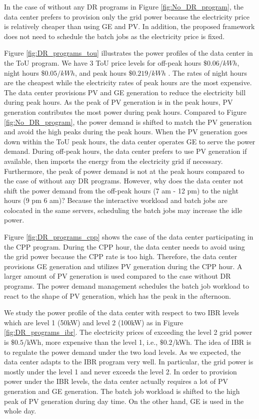 In the case of without any DR programs in Figure \ref{fig:No_DR_program}, the data center prefers to provision only the grid power because the electricity price is relatively cheaper than using GE and PV. In addition, the proposed framework does not need to schedule the batch jobs as the electricity price is fixed.

Figure \ref{fig:DR_programs_tou} illustrates the power profiles of the data center in the ToU program. We have 3 ToU price levels for off-peak hours $\$0.06/kWh$, night hours $\$0.05/kWh$, and peak hours $\$0.219/kWh$ \cite{Shahan2011ToUTexas}. The rates of night hours are the cheapest while the electricity rates of peak hours are the most expensive. The data center provisions PV and GE generation to reduce the electricity bill during peak hours. As the peak of PV generation is in the peak hours, PV generation contributes the most power during peak hours. Compared to Figure \ref{fig:No_DR_program}, the power demand is shifted to match the PV generation and avoid the high peaks during the peak hours. When the PV generation goes down within the ToU peak hours, the data center operates GE to serve the power demand. During off-peak hours, the data center prefers to use PV generation if available, then imports the energy from the electricity grid if necessary. Furthermore, the peak of power demand is not at the peak hours compared to the case of without any DR programs. However, why does the data center not shift the power demand from the off-peak hours (7 am - 12 pm) to the night hours (9 pm 6 am)? Because the interactive workload and batch jobs are colocated in the same servers, scheduling the batch jobs may increase the idle power.

Figure \ref{fig:DR_programs_cpp} shows the case of the data center participating in the CPP program. During the CPP hour, the data center needs to avoid using the grid power because the CPP rate is too high. Therefore, the data center provisions GE generation and utilizes PV generation during the CPP hour. A larger amount of PV generation is used compared to the case without DR programs. The power demand management schedules the batch job workload to react to the shape of PV generation, which has the peak in the afternoon.

We study the power profile of the data center with respect to two IBR levels which are level 1 (50kW) and level 2 (100kW) as in Figure \ref{fig:DR_programs_ibr}. The electricity prices of exceeding the level 2 grid power is $\$0.5$/kWh, more expensive than the level 1, i.e., $\$0.2$/kWh.  The idea of IBR is to regulate the power demand under the two load levels. As we expected, the data center adapts to the IBR program very well. In particular, the grid power is mostly under the level 1 and never exceeds the level 2. In order to provision power under the IBR levels, the data center actually requires a lot of PV generation and GE generation. The batch job workload is shifted to the high peak of PV generation during day time. On the other hand, GE is used in the whole day.

